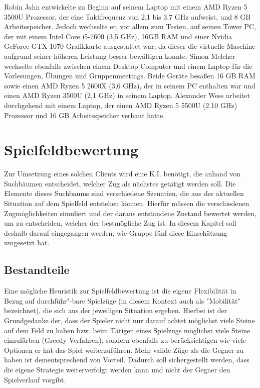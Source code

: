 \documentclass[12pt,a4paper,bibliography=totocnumbered,listof=totocnumbered]{article}
\begin{document}
Robin Jahn entwickelte zu Beginn auf seinem Laptop mit einem AMD Ryzen 5 3500U Prozessor, der eine Taktfrequenz von 2,1 bis 3,7 GHz aufweist, und 8 GB Arbeitsspeicher. Jedoch wechselte er, vor allem zum Testen, auf seinen Tower PC, der mit einem Intel Core i5-7600 (3,5 GHz), 16GB RAM und einer Nvidia GeForce GTX 1070 Grafikkarte ausgestattet war, da dieser die virtuelle Maschine aufgrund seiner höheren Leistung besser bewältigen konnte. Simon Melcher wechselte ebenfalls zwischen einem Desktop Computer und einem Laptop für die Vorlesungen, Übungen und Gruppenmeetings. Beide Geräte besaßen 16 GB RAM sowie einen AMD Ryzen 5 2600X (3,6 GHz), der in seinem PC enthalten war und einen AMD Ryzen 3500U (2,1 GHz) in seinem Laptop. Alexander Wess arbeitet durchgehend mit einem Laptop, der einen AMD Ryzen 5 5500U (2.10 GHz) Prozessor und 16 GB Arbeitsspeicher verbaut hatte.

\newpage
\section{Spielfeldbewertung}
Zur Umsetzung eines solchen Clients wird eine K.I. benötigt, die anhand von Suchbäumen entscheidet, welcher Zug als nächstes getätigt werden soll. Die Elemente dieses Suchbaums sind verschiedene Szenarien, die aus der aktuellen Situation auf dem Spielfeld entstehen können. Hierfür müssen die verschiedenen Zugmöglichkeiten simuliert und der daraus entstandene Zustand bewertet werden, um zu entscheiden, welcher der bestmögliche Zug ist.
In diesem Kapitel soll deshalb darauf eingegangen werden, wie Gruppe fünf diese Einschätzung umgesetzt hat.

\subsection{Bestandteile}\label{kap:Heuristik_Beschreibung}
Eine mögliche Heuristik zur Spielfeldbewertung ist die eigene Flexibilität in Bezug auf durchführ"-bare Spielzüge (in diesem Kontext auch als "Mobilität" bezeichnet), die sich aus der jeweiligen Situation ergeben. Hierbei ist der Grundgedanke der, dass der Spieler nicht nur darauf achtet möglichst viele Steine auf dem Feld zu haben bzw. beim Tätigen eines Spielzugs möglichst viele Steine einzufärben (Greedy-Verfahren), sondern ebenfalls zu berücksichtigen wie viele Optionen er hat das Spiel weiterzuführen. Mehr valide Züge als die Gegner zu haben ist dementsprechend von Vorteil. Dadurch soll sichergestellt werden, dass die eigene Strategie weiterverfolgt werden kann und nicht der Gegner den Spielverlauf vorgibt.
\end{document}
